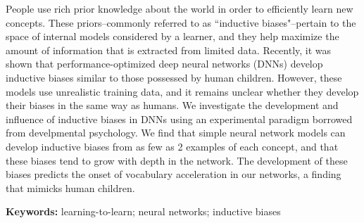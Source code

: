 People use rich prior knowledge about the world in order
to efficiently learn new concepts. These priors--commonly referred to as
``inductive biases"--pertain to the space of internal models considered by a
learner, and they help maximize the amount of information that is extracted
from limited data. Recently, it was shown that performance-optimized
deep neural networks (DNNs) develop inductive biases similar to those
possessed by human children. However, these models use unrealistic training
data, and it remains unclear whether they develop their biases in the same way
as humans. We investigate the development and influence of inductive biases
in DNNs using an experimental paradigm borrowed from develpmental psychology.
We find that simple neural network models can develop inductive
biases from as few as 2 examples of each concept, and that these biases tend
to grow with depth in the network. The development of these biases predicts
the onset of vocabulary acceleration in our networks, a finding that mimicks
human children.

\textbf{Keywords:}
learning-to-learn; neural networks; inductive biases